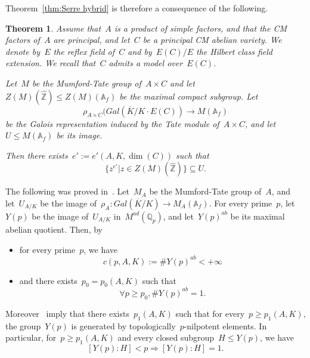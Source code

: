 \documentclass[12pt]{amsart}
\newtheorem{theorem}{Theorem}[section]
\newcommand{\Z}{{\mathbb Z}}
\newcommand{\Q}{{\mathbb Q}}
\newcommand{\A}{{\mathbb A}}
\newcommand{\ol}{\overline}
\begin{document}
Theorem~\ref{thm:Serre hybrid} is therefore a consequence of the following.
\begin{theorem}\label{thm:Serre unif principal}
 Assume that~$A$ is a product of simple factors, and that the CM factors of~$A$ are principal, and let~$C$ be a principal CM abelian variety. We denote by~$E$ the reflex field of~$C$ and by~$E(C)/E$ the Hilbert class field extension. We recall that~$C$ admits a model over~$E(C)$.


Let~$M$ be the Mumford-Tate group of~$A\times C$ and let~$Z(M)(\widehat{\Z})\leq Z(M)({\A_f})$ be the maximal compact subgroup. Let
\[
\rho_{A\times C}(Gal(\ol{K}/K\cdot E(C))\to M(\A_f)
\]
be the Galois representation induced by the Tate module of~$A\times C$, and let~$U\leq  M(\A_f)$ be its image.

Then there exists~$e':=e'(A,K,\dim(C))$ such that
\begin{equation}\label{eq:thm SUP}
\{z^{e'}| z\in Z(M)(\widehat{\Z})\}\subseteq U.
\end{equation}
\end{theorem}
The following was proved in~\cite[App. B]{RY:IHES}. Let~$M_A$ be the Mumford-Tate group of~$A$, and let~$U_{A/K}$ be the image of~$\rho_A:Gal(\ol{K}/K)\to M_A(\A_f)$. 
For every prime~$p$, let~$Y(p)$ be the image of~$U_{A/K}$ in~$M^{ad}(\Q_p)$, and let~$Y(p)^{ab}$ be its maximal abelian quotient. Then, by~\cite[App. B (110) and (111)]{RY:IHES}
\begin{itemize}
\item for every prime~$p$, we have
\begin{equation}\label{eq:110}
c(p,A,K):=\# Y(p)^{ab}<+\infty
\end{equation}
\item and there exists~$p_0=p_0(A,K)$ such that
\begin{equation}
\label{eq:111}
\forall p\geq p_0, \# Y(p)^{ab}=1.
\end{equation}
\end{itemize}
Moreover~\cite[App. B (113)]{RY:IHES} imply that there exists~$p_1(A,K)$ such that for every~$p\geq p_1(A,K)$, the group~$Y(p)$ is generated by topologically~$p$-nilpotent elements. In particular, for~$p\geq p_1(A,K)$ and every closed subgroup~$H\leq Y(p)$, we have
\begin{equation}\label{eq:113}
[Y(p):H]<p\Rightarrow
[Y(p):H]=1.
\end{equation}
\end{document}
